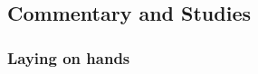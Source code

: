 	
	
	
\subsection{Commentary and Studies} %
	\label{HAND-COMMENTARY}

	
		
	\subsubsection{Laying on hands}
		\label{HAND-laying}
		
